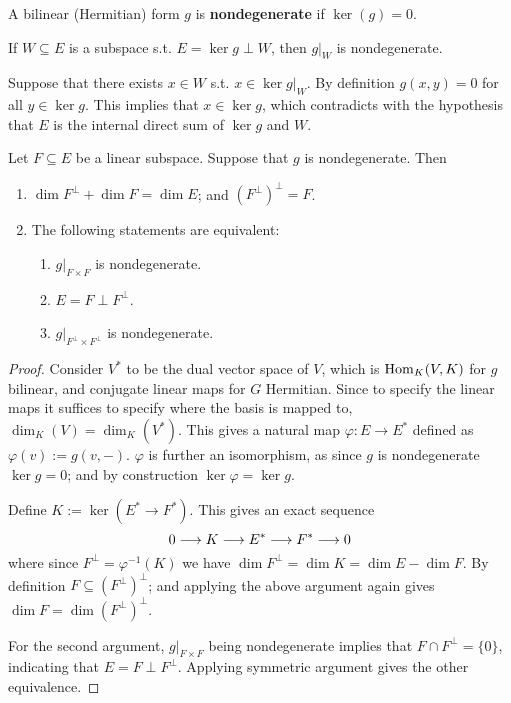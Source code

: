 \documentclass{article}
\begin{document}
\begin{definition}
    A bilinear (Hermitian) form $g$ is \textbf{nondegenerate} if $\ker(g) = 0$.
\end{definition}

\begin{remark}
    If $W \subseteq E$ is a subspace s.t. $E = \ker g \perp W$, then $g|_W$ is nondegenerate. 

    Suppose that there exists $x \in W$ s.t. $x \in \ker g|_W$. By definition $g(x, y) = 0$ for all $y \in \ker g$. This implies that $x \in \ker g$, which contradicts with the hypothesis that $E$ is the internal direct sum of $\ker g$ and $W$.
\end{remark}

\begin{proposition}
    Let $F \subseteq E$ be a linear subspace. Suppose that $g$ is nondegenerate. Then
    \begin{enumerate}[label=\roman*)]
        \item $\dim F^{\perp} + \dim F = \dim E$; and $(F^{\perp})^{\perp} = F$.
        \item The following statements are equivalent:
        \begin{enumerate}
            \item $g|_{F \times F}$ is nondegenerate.
            \item $E = F \perp F^{\perp}$.
            \item $g|_{F^{\perp} \times F^{\perp}}$ is nondegenerate.
        \end{enumerate}
    \end{enumerate}
\end{proposition}

\begin{proof}
    Consider $V^*$ to be the dual vector space of $V$, which is $\mathrm{Hom}_K(V, K)$ for $g$ bilinear, and conjugate linear maps for $G$ Hermitian. Since to specify the linear maps it suffices to specify where the basis is mapped to, $\dim_K(V) = \dim_K(V^{\ast})$. This gives a natural map $\varphi: E \to E^{\ast}$ defined as $\varphi(v) := g(v, -)$. $\varphi$ is further an isomorphism, as since $g$ is nondegenerate $\ker g = 0$; and by construction $\ker \varphi = \ker g$.

    Define $K := \ker (E^{\ast} \to F^{\ast})$. This gives an exact sequence
    \[
        0 \longrightarrow K \longrightarrow E^{\ast} \longrightarrow F^{\ast} \longrightarrow 0
    \]
    where since $F^{\perp} = \varphi^{-1}(K)$ we have $\dim F^{\perp} = \dim K = \dim E - \dim F$. By definition $F \subseteq (F^{\perp})^{\perp}$; and applying the above argument again gives $\dim F = \dim (F^{\perp})^{\perp}$.
    
    For the second argument, $g|_{F \times F}$ being nondegenerate implies that $F \cap F^{\perp} = \{0\}$, indicating that $E = F \perp F^{\perp}$. Applying symmetric argument gives the other equivalence.
\end{proof}
\end{document}
